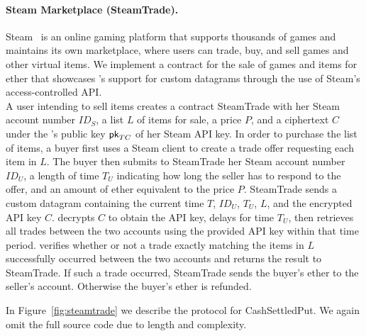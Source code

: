 \paragraph{Steam Marketplace ({\sf SteamTrade}).} Steam~\cite{steam} is an online gaming platform that supports thousands of games and maintains its own marketplace, where users can trade, buy, and sell games and other virtual items.  We implement a contract for the sale of games and items for ether that showcases \tc's support for custom datagrams through the use of Steam's access-controlled API.\\
\indent A user intending to sell items creates a contract {\sf SteamTrade} with her Steam account number $ID_S$, a list $L$ of items for sale, a price $P$, and a ciphertext $C$ under the \tc's public key ${\sf pk}_{TC}$ of her Steam API key.  In order to purchase the list of items, a buyer first uses a Steam client to create a trade offer requesting each item in $L$.  The buyer then submits to {\sf SteamTrade} her Steam account number $ID_U$, a length of time $T_U$ indicating how long the seller has to respond to the offer, and an amount of ether equivalent to the price $P$.  {\sf SteamTrade} sends \tc a custom datagram containing the current time $T$, $ID_U$, $T_U$, $L$, and the encrypted API key $C$.  \tc decrypts $C$ to obtain the API key, delays for time $T_U$, then retrieves all trades between the two accounts using the provided API key within that time period.  \tc verifies whether or not a trade exactly matching the items in $L$ successfully occurred between the two accounts and returns the result to {\sf SteamTrade}.  If such a trade occurred, {\sf SteamTrade} sends the buyer's ether to the seller's account.  Otherwise the buyer's ether is refunded.

In Figure~\ref{fig:steamtrade} we describe the protocol for {\sf CashSettledPut}.
We again omit the full source code due to length and complexity.

